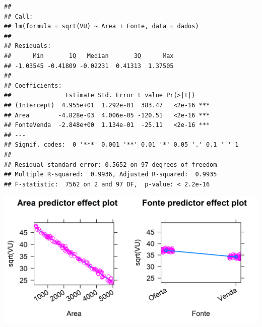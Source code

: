 \documentclass{article}
\begin{document}
\begin{verbatim}
## 
## Call:
## lm(formula = sqrt(VU) ~ Area + Fonte, data = dados)
## 
## Residuals:
##      Min       1Q   Median       3Q      Max 
## -1.03545 -0.41809 -0.02231  0.41313  1.37505 
## 
## Coefficients:
##               Estimate Std. Error t value Pr(>|t|)    
## (Intercept)  4.955e+01  1.292e-01  383.47   <2e-16 ***
## Area        -4.828e-03  4.006e-05 -120.51   <2e-16 ***
## FonteVenda  -2.848e+00  1.134e-01  -25.11   <2e-16 ***
## ---
## Signif. codes:  0 '***' 0.001 '**' 0.01 '*' 0.05 '.' 0.1 ' ' 1
## 
## Residual standard error: 0.5652 on 97 degrees of freedom
## Multiple R-squared:  0.9936, Adjusted R-squared:  0.9935 
## F-statistic:  7562 on 2 and 97 DF,  p-value: < 2.2e-16
\end{verbatim}

\includegraphics{./images/unnamed-chunk-34-1.png}
\end{document}
